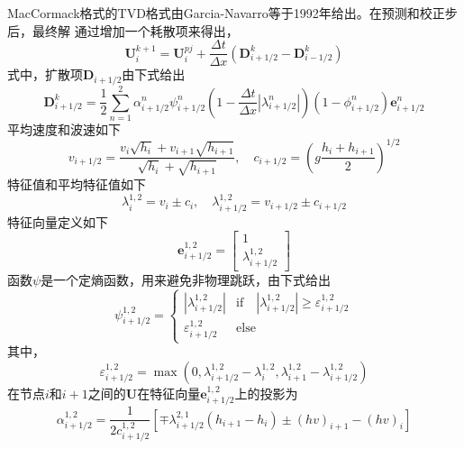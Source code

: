 MacCormack格式的TVD格式由Garcia-Navarro等于1992年给出。在预测和校正步后，最终解
通过增加一个耗散项来得出，
\begin{equation}
  \mathbf{U}_{i}^{k+1} =
  \mathbf{U}_{i}^{pj} +
  \frac{\Delta t}{\Delta x}
  \left(
    \mathbf{D}_{i+1/2}^{k} -
    \mathbf{D}_{i-1/2}^{k}
  \right)
\end{equation}
式中，扩散项$\mathbf{D}_{i+1/2}$由下式给出
\begin{equation}
  \mathbf{D}_{i+1/2}^{k} =
  \frac{1}{2}
  \sum_{n=1}^{2}
  \alpha_{i+1/2}^{n}
  \psi_{i+1/2}^{n}
  \left(
    1 - 
    \frac{\Delta t}{\Delta x}
    \left|
    \lambda_{i+1/2}^{n}
    \right|
  \right)
  \left(
    1-\phi_{i+1/2}^{n}
  \right)
  \mathbf{e}_{i+1/2}^{n}
\end{equation}
平均速度和波速如下
\begin{equation}
  v_{i+1/2} = 
  \frac
  {v_{i}\sqrt{h_{i}} + v_{i+1}\sqrt{h_{i+1}}}
  {\sqrt{h_{i}}+\sqrt{h_{i+1}}}
  ,\quad
  c_{i+1/2} =
  \left(
    g 
    \frac{h_{i}+h_{i+1}}{2}
  \right)^{1/2}
\end{equation}
特征值和平均特征值如下
\begin{equation}
  \lambda_{i}^{1,2} = v_{i}\pm c_{i}
  ,\quad
  \lambda_{i+1/2}^{1,2} = v_{i+1/2}\pm c_{i+1/2}
\end{equation}
特征向量定义如下
\begin{equation}
  \mathbf{e}_{i+1/2}^{1,2} 
  =
  \begin{bmatrix}
    1 \\
    \lambda_{i+1/2}^{1,2}
  \end{bmatrix}
\end{equation}
函数$\psi$是一个定熵函数，用来避免非物理跳跃，由下式给出
\begin{equation}
  \psi_{i+1/2}^{1,2} =
  \begin{cases}
    |\lambda_{i+1/2}^{1,2}| & \mathrm{if} \quad |\lambda_{i+1/2}^{1,2}| \ge \varepsilon_{i+1/2}^{1,2} \\
    \varepsilon_{i+1/2}^{1,2} & \mathrm{else}
  \end{cases}
\end{equation}
其中，
\begin{equation}
\varepsilon_{i+1/2}^{1,2} =
\max 
\left(
  0,
  \lambda_{i+1/2}^{1,2} - \lambda_{i}^{1,2},
  \lambda_{i+1}^{1,2} - \lambda_{i+1/2}^{1,2}
\right)
\end{equation}
在节点$i$和$i+1$之间的$\mathbf{U}$在特征向量$\mathbf{e}_{i+1/2}^{1,2}$上的投影为
\begin{equation}
\alpha_{i+1/2}^{1,2} = 
\frac{1}{2c_{i+1/2}^{1,2}}
\left[
  \mp\lambda_{i+1/2}^{2,1}(h_{i+1}-h_{i})
  \pm
  (hv)_{i+1} - (hv)_{i}
\right]
\end{equation}
